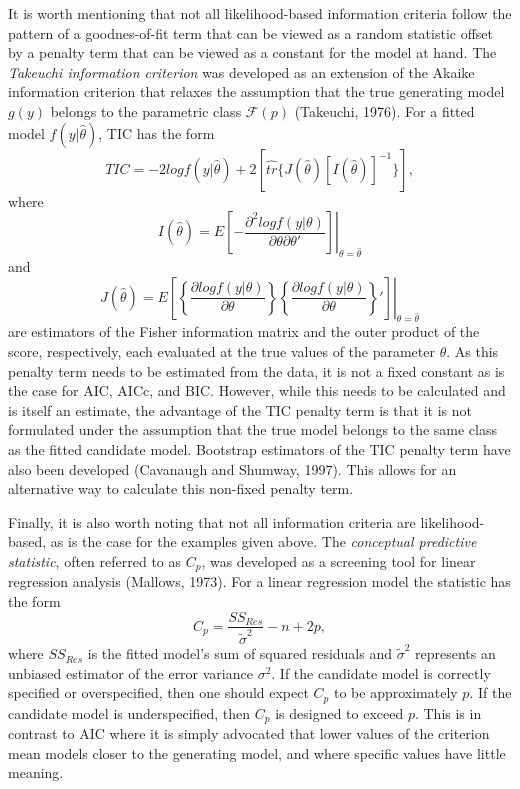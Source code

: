 		It is worth mentioning that not all likelihood-based information criteria follow the pattern of a goodnes-of-fit term that can be viewed as a random statistic offset by a penalty term that
		can be viewed as a constant for the model at hand. The \textit{Takeuchi information criterion} was developed as an extension of the Akaike information criterion that relaxes the
		assumption that the true generating model $g(y)$ belongs to the parametric class $\mathcal{F}(p)$ (Takeuchi, 1976). For a fitted model $f(y|\hat{\theta})$, TIC has the form
		\begin{equation}
			TIC = -2 log f(y|\hat{\theta}) + 2 \left[ \hat{tr} \{ J(\hat{\theta}) [I(\hat{\theta})]^{-1} \} \right] ,
		\end{equation}
		where
		\begin{equation}
			I(\hat{\theta}) = E \left. \left[ -\frac{\partial^2 log f(y|\theta)}{\partial \theta \partial \theta '} \right] \right|_{\theta = \hat{\theta}}
		\end{equation}
		and
		\begin{equation}
			J(\hat{\theta}) = E \left. \left[ \left\{ \frac{\partial log f(y|\theta)}{\partial \theta} \right\} \left\{ \frac{\partial log f(y|\theta)}{\partial \theta} \right\}'  \right] \right|_{\theta = \hat{\theta}}
		\end{equation}
		are estimators of the Fisher information matrix and the outer product of the score, respectively, each evaluated at the true values of the parameter $\theta$. As this penalty term needs
		to be estimated from the data, it is not a fixed constant as is the case for AIC, AICc, and BIC. However, while this needs to be calculated and is itself an estimate, the advantage of
		the TIC penalty term is that it is not formulated under the assumption that the true model belongs to the same class as the fitted candidate model. Bootstrap estimators of the TIC
		penalty term have also been developed (Cavanaugh and Shumway, 1997). This allows for an alternative way to calculate this non-fixed penalty term.

		Finally, it is also worth noting that not all information criteria are likelihood-based, as is the case for the examples given above. The \textit{conceptual predictive statistic}, often
		referred to as $C_p$, was developed as a screening tool for linear regression analysis (Mallows, 1973). For a linear regression model the statistic has the form
		\begin{equation}
			C_p = \frac{SS_{Res}}{\tilde{\sigma}^2} - n + 2p ,
		\end{equation}
		where $SS_{Res}$ is the fitted model's sum of squared residuals and $\tilde{\sigma}^2$ represents an unbiased estimator of the error variance $\sigma^2$. If the candidate model is correctly
		specified or overspecified, then one should expect $C_p$ to be approximately $p$. If the candidate model is underspecified, then $C_p$ is designed to exceed $p$. This is in contrast to AIC
		where it is simply advocated that lower values of the criterion mean models closer to the generating model, and where specific values have little meaning.
		
